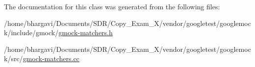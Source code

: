 The documentation for this class was generated from the following files\+:\begin{DoxyCompactItemize}
\item 
/home/bhargavi/\+Documents/\+S\+D\+R/\+Copy\+\_\+\+Exam\+\_\+X/vendor/googletest/googlemock/include/gmock/\hyperlink{gmock-matchers_8h}{gmock-\/matchers.\+h}\item 
/home/bhargavi/\+Documents/\+S\+D\+R/\+Copy\+\_\+\+Exam\+\_\+X/vendor/googletest/googlemock/src/\hyperlink{gmock-matchers_8cc}{gmock-\/matchers.\+cc}\end{DoxyCompactItemize}
